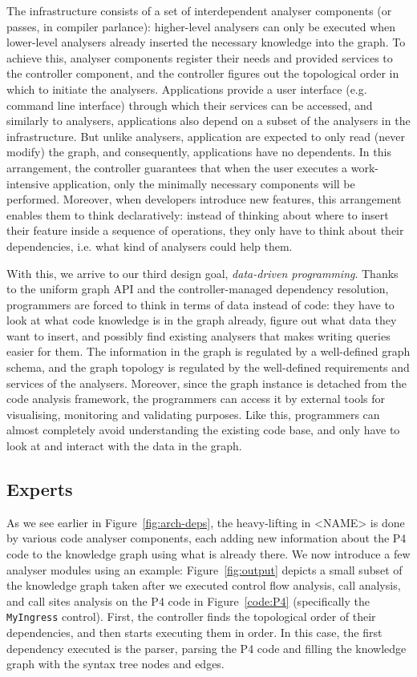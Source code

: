 \documentclass[sigconf]{acmart}
\begin{document}
The infrastructure consists of a set of interdependent analyser components (or passes, in compiler parlance): higher-level analysers can only be executed when lower-level analysers already inserted the necessary knowledge into the graph. To achieve this, analyser components register their needs and provided services to the controller component, and the controller figures out the topological order in which to initiate the analysers. 
Applications provide a user interface (e.g. command line interface) through which their services can be accessed, and similarly to analysers, applications also depend on a subset of the analysers in the infrastructure. But unlike analysers, application are expected to only read (never modify) the graph, and consequently, applications have no dependents. 
In this arrangement, the controller guarantees that when the user executes a work-intensive application, only the minimally necessary components will be performed.
Moreover, when developers introduce new features, this arrangement enables them to think declaratively: instead of thinking about where to insert their feature inside a sequence of operations, they only have to think about their dependencies, i.e. what kind of analysers could help them.

With this, we arrive to our third design goal, \textit{data-driven programming}. Thanks to the uniform graph API and the controller-managed dependency resolution, programmers are forced to think in terms of data instead of code: they have to look at what code knowledge is in the graph already, figure out what data they want to insert, and possibly find existing analysers that makes writing queries  easier for them. 
The information in the graph is regulated by a well-defined graph schema, and the graph topology is regulated by the well-defined requirements and services of the analysers. Moreover, since the graph instance is detached from the code analysis framework, the programmers can access it by external tools for visualising, monitoring and validating purposes.
Like this, programmers can almost completely avoid understanding the existing code base, and only have to look at and interact with the data in the graph.  
	
	\subsection{Experts} %
  As we see earlier in Figure~\ref{fig:arch-deps}, the heavy-lifting in <NAME> is done by various code analyser components, each adding new information about the P4 code to the knowledge graph using what is already there. We now introduce a few analyser modules using an example: Figure~\ref{fig:output} depicts a small subset of the knowledge graph taken after we executed control flow analysis, call analysis, and call sites analysis on the P4 code in Figure~\ref{code:P4} (specifically the \texttt{MyIngress} control). 
  First, the controller finds the topological order of their dependencies, and then starts executing them in order. In this case, the first dependency executed is the parser, parsing the P4 code and filling the knowledge graph with the syntax tree nodes and edges. 
\end{document}
